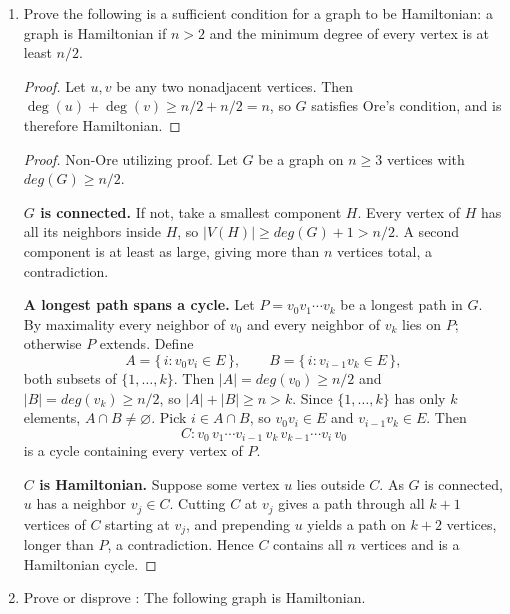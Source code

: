 \documentclass[11pt]{article}
\theoremstyle{solstyle}
\begin{document}
\begin{enumerate}[leftmargin=*]

\item Prove the following is a sufficient condition for a graph to be Hamiltonian: a graph is Hamiltonian if $n > 2$ and the minimum degree of every vertex is at least $n/2$.

\begin{proof}
Let $u,v$ be any two nonadjacent vertices. Then $\deg(u)+\deg(v) \geq n/2 + n/2 = n$, so $G$ satisfies Ore's condition, and is therefore Hamiltonian.
\end{proof}

\begin{proof}
Non-Ore utilizing proof. 
Let $G$ be a graph on $n \geq 3$ vertices with $deg(G) \geq n/2$.

\textbf{$G$ is connected.} If not, take a smallest component $H$. Every vertex of $H$ has all its neighbors inside $H$, so $|V(H)| \geq deg(G) + 1 > n/2$. A second component is at least as large, giving more than $n$ vertices total, a contradiction.

\textbf{A longest path spans a cycle.} Let $P = v_0 v_1 \cdots v_k$ be a longest path in $G$. By maximality every neighbor of $v_0$ and every neighbor of $v_k$ lies on $P$; otherwise $P$ extends. Define
$$A = \{\, i : v_0 v_i \in E \,\}, \qquad B = \{\, i : v_{i-1} v_k \in E \,\},$$
both subsets of $\{1, \dots, k\}$. Then $|A| = deg(v_0) \geq n/2$ and $|B| = deg(v_k) \geq n/2$, so $|A| + |B| \geq n > k$. Since $\{1,\dots,k\}$ has only $k$ elements, $A \cap B \neq \varnothing$. Pick $i \in A \cap B$, so $v_0 v_i \in E$ and $v_{i-1} v_k \in E$. Then
$$C : v_0 \, v_1 \cdots v_{i-1} \, v_k \, v_{k-1} \cdots v_i \, v_0$$
is a cycle containing every vertex of $P$.

\textbf{$C$ is Hamiltonian.} Suppose some vertex $u$ lies outside $C$. As $G$ is connected, $u$ has a neighbor $v_j \in C$. Cutting $C$ at $v_j$ gives a path through all $k+1$ vertices of $C$ starting at $v_j$, and prepending $u$ yields a path on $k+2$ vertices, longer than $P$, a contradiction. Hence $C$ contains all $n$ vertices and is a Hamiltonian cycle.
\end{proof}




\item Prove or disprove : The following graph is Hamiltonian.
\begin{center}
\end{center}
\end{enumerate}
\end{document}
